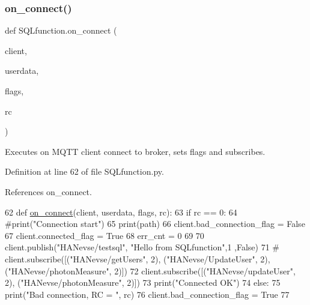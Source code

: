\subsubsection{\texorpdfstring{on\+\_\+connect()}{on\_connect()}}
{\footnotesize\ttfamily def S\+Q\+Lfunction.\+on\+\_\+connect (\begin{DoxyParamCaption}\item[{}]{client,  }\item[{}]{userdata,  }\item[{}]{flags,  }\item[{}]{rc }\end{DoxyParamCaption})}



Executes on M\+Q\+TT client connect to broker, sets flags and subscribes. 



Definition at line 62 of file S\+Q\+Lfunction.\+py.



References on\+\_\+connect.


\begin{DoxyCode}
62 \textcolor{keyword}{def }\hyperlink{namespace_s_q_lfunction_a215e7090f82fbf0d31fd97be6721389a}{on\_connect}(client, userdata, flags, rc):
63     \textcolor{keywordflow}{if} rc == 0:
64         \textcolor{comment}{#print("Connection start")}
65         print(path)
66         client.bad\_connection\_flag = \textcolor{keyword}{False}
67         client.connected\_flag = \textcolor{keyword}{True}        
68         err\_cnt = 0
69 
70         client.publish(\textcolor{stringliteral}{"HANevse/testsql"}, \textcolor{stringliteral}{"Hello from SQLfunction"},1 ,\textcolor{keyword}{False})
71 \textcolor{comment}{#        client.subscribe([("HANevse/getUsers", 2), ("HANevse/UpdateUser", 2), ("HANevse/photonMeasure",
       2)])}
72         client.subscribe([(\textcolor{stringliteral}{"HANevse/updateUser"}, 2), (\textcolor{stringliteral}{"HANevse/photonMeasure"}, 2)])
73         print(\textcolor{stringliteral}{"Connected OK"})
74     \textcolor{keywordflow}{else}:
75         print(\textcolor{stringliteral}{"Bad connection, RC = "}, rc)
76         client.bad\_connection\_flag = \textcolor{keyword}{True}
77 
\end{DoxyCode}
\mbox{\label{namespace_s_q_lfunction_a3a3d48b63f188d8357c3422e417a58dc}} 
